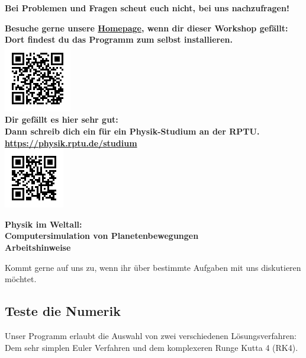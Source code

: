 \documentclass{scrartcl}
\begin{document}
        \vspace{1cm}
        {\large\textbf{\sffamily Bei Problemen und Fragen scheut euch nicht, bei uns nachzufragen!}}\\[3cm]
        \vfill
        \begin{center}
        \noindent\textbf{Besuche gerne unsere \href{https://www.physik.uni-kl.de/rethfeld/}{Homepage}, wenn dir dieser Workshop gefällt: \\
        Dort findest du das Programm zum selbst installieren.\\}
        \includegraphics*[width=.2\textwidth]{qr_rethfeld.png}\\
        \vspace{2cm}
        \textbf{Dir gefällt es hier sehr gut:\\ Dann schreib dich ein für ein Physik-Studium an der RPTU.\\
        \url{https://physik.rptu.de/studium}}\\
        \includegraphics*[width=.2\textwidth]{qr_studium.png}
        \end{center}
        \newpage
    
\begin{center}
    {\huge\textbf{\sffamily Physik im Weltall:\\ Computersimulation von Planetenbewegungen}}\\[.75cm]
        {\Large\textbf{\sffamily Arbeitshinweise}}
\end{center}

        Kommt gerne auf uns zu, wenn ihr über bestimmte Aufgaben mit uns diskutieren möchtet.\\
        \subsection*{Teste die Numerik}
        Unser Programm erlaubt die Auswahl von zwei verschiedenen Lösungsverfahren:\\
        Dem sehr simplen Euler Verfahren und dem komplexeren Runge Kutta 4 (RK4).\\
\end{document}
